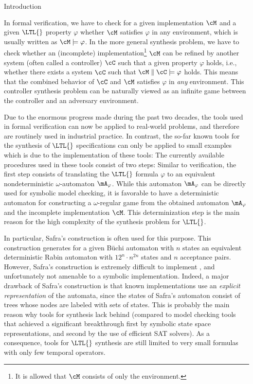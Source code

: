 \documentclass[copyright,creativecommons]{eptcs}
\begin{document}
\begin{section}{Introduction}

In formal verification, we have to check for a given implementation $\cM$ and a given $\LTL{}$ property $\varphi$ whether $\cM$ satisfies $\varphi$ in any environment, which is usually written as $\cM\models\varphi$. In the more general synthesis problem, we have to check whether an (incomplete) implementation\footnote{It is allowed that $\cM$ consists of only the environment.} $\cM$ can be refined by another system (often called a controller) $\cC$ such that a given property $\varphi$ holds, i.e., whether there exists a system $\cC$ such that $\cM\parallel\cC\models\varphi$ holds. This means that the combined behavior of $\cC$ and $\cM$ satisfies $\varphi$ in \emph{any} environment. This controller synthesis problem can be naturally viewed as an infinite game between the controller and an adversary environment.

Due to the enormous progress made during the past two decades, the tools used in formal verification can now be applied to real-world problems, and therefore are routinely used in industrial practice. In contrast, the so-far known tools for the synthesis of $\LTL{}$ specifications can only be applied to small examples which is due to the implementation of these tools: The currently available procedures used in these tools consist of two steps: Similar to verification, the first step consists of translating the $\LTL{}$ formula $\varphi$ to an equivalent nondeterministic $\omega$-automaton $\mA_\varphi$. While this automaton $\mA_\varphi$ can be directly used for symbolic model checking, it is favorable to have a deterministic automaton for constructing a $\omega$-regular game from the obtained automaton $\mA_\varphi$ and the incomplete implementation $\cM$. This determinization step is the main reason for the high complexity of the synthesis problem for $\LTL{}$.

In particular, Safra's construction \cite{Safr88} is often used for this purpose. This construction generates for a given Büchi automaton with $n$ states an equivalent deterministic Rabin automaton with $12^n\cdot n^{2n}$ states and $n$ acceptance pairs. However, Safra's construction is extremely difficult to implement \cite{KlBa06}, and unfortunately not amenable to a symbolic implementation. Indeed, a major drawback of Safra's construction is that known implementations use an \emph{explicit representation} of the automata, since the states of Safra's automaton consist of trees whose nodes are labeled with sets of states. This is probably the main reason why tools for synthesis lack behind (compared to model checking tools that achieved a significant breakthrough first by symbolic state space representations, and second by the use of efficient SAT solvers). As a consequence, tools for $\LTL{}$ synthesis are still limited to very small formulas with only few temporal operators.


\end{section}
\end{document}
